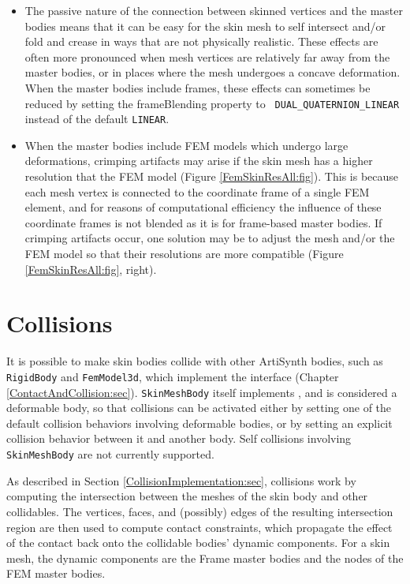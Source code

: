 \begin{itemize}

\item The passive nature of the connection between skinned vertices
and the master bodies means that it can be easy for the skin mesh
to self intersect and/or fold and crease in ways that are not
physically realistic. These effects are often more pronounced when
mesh vertices are relatively far away from the master bodies, or in
places where the mesh undergoes a concave deformation. When the master
bodies include frames, these effects can sometimes be reduced by
setting the {\sf frameBlending} property to {\tt
DUAL\_QUATERNION\_LINEAR} instead of the default {\tt LINEAR}.

\item When the master bodies include FEM models which undergo large
deformations, crimping artifacts may arise if the skin mesh has a
higher resolution that the FEM model (Figure
\ref{FemSkinResAll:fig}). This is because each mesh vertex is
connected to the coordinate frame of a single FEM element, and for
reasons of computational efficiency the influence of these coordinate
frames is not blended as it is for frame-based master bodies.  If
crimping artifacts occur, one solution may be to adjust the mesh
and/or the FEM model so that their resolutions are more compatible
(Figure \ref{FemSkinResAll:fig}, right).

\end{itemize}

\section{Collisions}
\label{SkinCollisions:sec}

It is possible to make skin bodies collide with other ArtiSynth
bodies, such as {\tt RigidBody} and {\tt FemModel3d}, which implement
the  interface
(Chapter \ref{ContactAndCollision:sec}). {\tt SkinMeshBody} itself
implements , and
is considered a deformable body, so that collisions can be activated
either by setting one of the default collision behaviors involving
deformable bodies, or by setting an explicit collision behavior
between it and another body. Self collisions involving {\tt
SkinMeshBody} are not currently supported.

As described in Section \ref{CollisionImplementation:sec}, collisions
work by computing the intersection between the meshes of the skin body
and other collidables. The vertices, faces, and (possibly) edges of
the resulting intersection region are then used to compute contact
constraints, which propagate the effect of the contact back onto the
collidable bodies' dynamic components. For a skin mesh, the dynamic
components are the Frame master bodies and the nodes of the FEM master
bodies.

